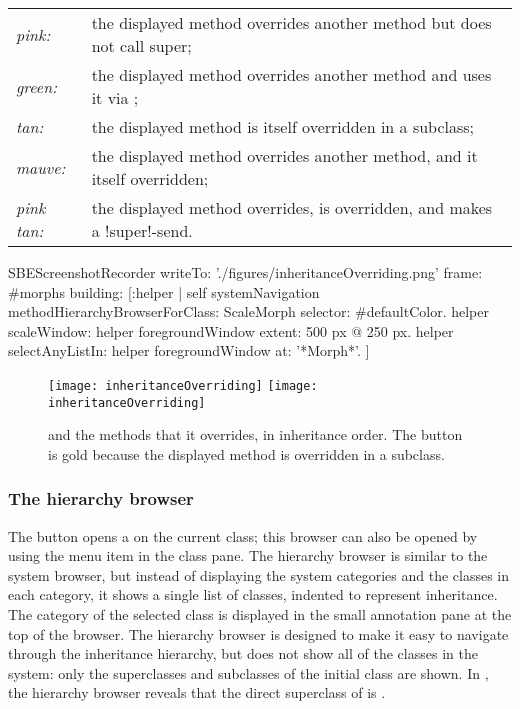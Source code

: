 \documentclass[a4paper,10pt,twoside]{book}
\begin{document}
\begin{tabular}{lp{9cm}}
	\emph{pink:} & the displayed method overrides another method but does not call super;\\
	\emph{green:} & the displayed method overrides another method and uses it via \super;\\
	\emph{tan:} & the displayed method is itself overridden in a subclass;\\
	\emph{mauve:} & the displayed method overrides another method, and it itself overridden;\\
	\emph{pink tan:} & the displayed method overrides, is overridden, and makes a \ct!super!-send.
\end{tabular}

\begin{ExecuteSmalltalkScript}
SBEScreenshotRecorder writeTo: './figures/inheritanceOverriding.png' frame: #morphs building: [:helper |
	self systemNavigation
		methodHierarchyBrowserForClass: ScaleMorph
		selector: #defaultColor.
	helper scaleWindow: helper foregroundWindow extent: 500 px @ 250 px.
	helper selectAnyListIn: helper foregroundWindow at: '*Morph*'.
]
\end{ExecuteSmalltalkScript}
\begin{figure}[tbp]
	\begin{center}
   \ifluluelse
		{\texttt{[image: inheritanceOverriding]}}
		{\texttt{[image: inheritanceOverriding]}}
	\end{center}
	\caption{ and the methods that it overrides, in inheritance order.
	The  button is gold because the displayed method is overridden in a subclass.}
	\label{fig:inheritanceOverriding}
\end{figure}


\subsubsection{The hierarchy browser}
\label{sec:hierarchy}

The  button opens a  on the current class; this browser can also be opened by using the  menu item in the class pane.
The hierarchy browser is similar to the system browser, but instead of displaying the system categories and the classes in each category, it shows a single list of classes, indented to represent inheritance.
The category of the selected class is displayed in the small annotation pane at the top of the browser.
The hierarchy browser is designed to make it easy to navigate through the inheritance hierarchy, but does not show all of the classes in the system: only the superclasses and subclasses of the initial class are shown.
In , the hierarchy browser reveals that the direct superclass of  is .
\end{document}
